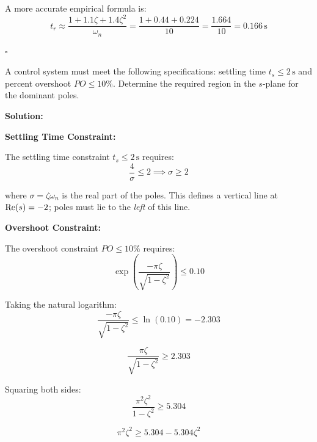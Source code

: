 A more accurate empirical formula is:
\begin{equation}
t_r \approx \frac{1 + 1.1\zeta + 1.4\zeta^2}{\omega_n} = \frac{1 + 0.44 + 0.224}{10} = \frac{1.664}{10} = 0.166\,\text{s}
\end{equation}

\hfill$\square$

\begin{example}
\label{ex:pole_placement}
A control system must meet the following specifications: settling time $t_s \leq 2\,\text{s}$ and percent overshoot $PO \leq 10\%$. Determine the required region in the $s$-plane for the dominant poles.
\end{example}

\textbf{Solution:}

\textbf{Settling Time Constraint:}

The settling time constraint $t_s \leq 2\,\text{s}$ requires:
\begin{equation}
\frac{4}{\sigma} \leq 2 \implies \sigma \geq 2
\end{equation}

where $\sigma = \zeta\omega_n$ is the real part of the poles. This defines a vertical line at $\mathrm{Re}(s) = -2$; poles must lie to the \textit{left} of this line.

\textbf{Overshoot Constraint:}

The overshoot constraint $PO \leq 10\%$ requires:
\begin{equation}
\exp\left(\frac{-\pi\zeta}{\sqrt{1-\zeta^2}}\right) \leq 0.10
\end{equation}

Taking the natural logarithm:
\begin{equation}
\frac{-\pi\zeta}{\sqrt{1-\zeta^2}} \leq \ln(0.10) = -2.303
\end{equation}

\begin{equation}
\frac{\pi\zeta}{\sqrt{1-\zeta^2}} \geq 2.303
\end{equation}

Squaring both sides:
\begin{equation}
\frac{\pi^2\zeta^2}{1-\zeta^2} \geq 5.304
\end{equation}

\begin{equation}
\pi^2\zeta^2 \geq 5.304 - 5.304\zeta^2
\end{equation}

